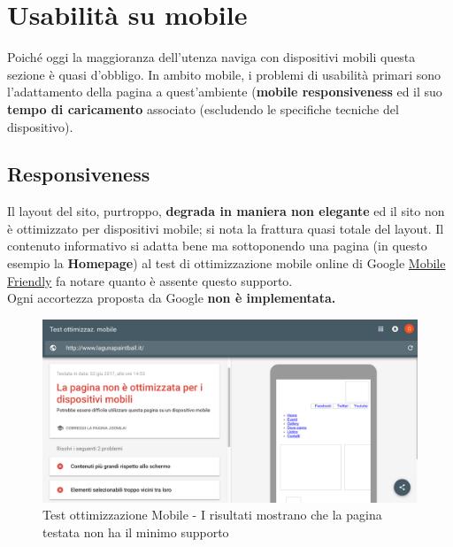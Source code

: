 \documentclass[../Relazione.tex]{subfiles}
\begin{document}
\section{Usabilità su mobile}
	Poiché oggi la maggioranza dell'utenza naviga con dispositivi mobili questa sezione è quasi d'obbligo. 
	In ambito mobile, i problemi di usabilità primari sono l'adattamento della pagina a quest'ambiente (\textbf{mobile responsiveness} ed il suo \textbf{tempo di caricamento} associato (escludendo le specifiche tecniche del dispositivo).

	\subsection{Responsiveness}
		Il layout del sito, purtroppo, \textbf{degrada in maniera non elegante} ed il sito non è ottimizzato per dispositivi mobile; si nota la frattura quasi totale del layout. Il contenuto informativo si adatta bene ma sottoponendo una pagina (in questo esempio la \textbf{Homepage}) al test di ottimizzazione mobile online di Google \href{https://www.google.com/webmasters/tools/mobile-friendly/?hl=it}{Mobile Friendly} fa notare quanto è assente questo supporto.\\Ogni accortezza proposta da Google \textbf{non è implementata.}

		\begin{figure}[!h]
			\centering
			\includegraphics[width=\textwidth]{img/sito/MobileSupport.png}
			\caption{Test ottimizzazione Mobile - I risultati mostrano che la pagina testata non ha il minimo supporto}
			\label{fig:label}
		\end{figure}

\newpage
\end{document}
